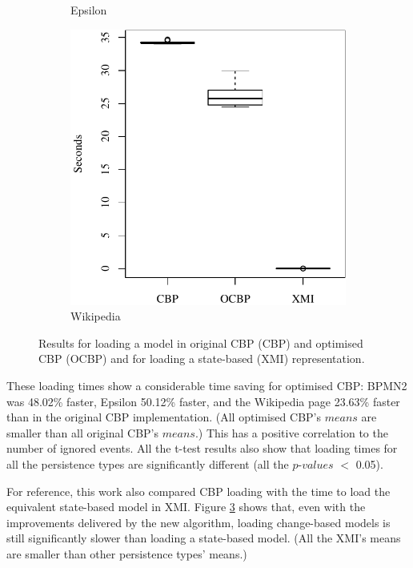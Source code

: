 {\begin{figure}[ht]
\begin{subfigure}{0.325\textwidth}
      \caption{Epsilon}
      \label{fig:load_time_epsilon}
    \end{subfigure}
    \hfill
    \begin{subfigure}{0.325\textwidth}
      \centering
      \includegraphics[width=\linewidth]{images/ol_load_time_wikipedia}
      \caption{Wikipedia}
      \label{fig:load_time_wikipedia}
    \end{subfigure}
    \caption{Results for loading a model in original CBP (CBP) and optimised CBP (OCBP) and for loading a state-based (XMI) representation.}
    \label{fig:loadtime}
  \end{figure}
  
  These loading times show a considerable time saving for optimised CBP: BPMN2 was 48.02\% faster, Epsilon 50.12\% faster, and the Wikipedia page 23.63\% faster than in the original CBP implementation. (All optimised CBP’s $means$ are smaller than all original CBP’s $means$.) This has a positive correlation to the number of ignored events. All the t-test results also show that loading times for all the persistence types are significantly different (all the $p$-$values$ $<$ 0.05).
  
  For reference, this work also compared CBP loading with the time to load the equivalent state-based model in XMI. Figure \ref{fig:loadtime} shows that, even with the improvements delivered by the new algorithm, loading change-based models is still significantly slower than loading a state-based model. (All the XMI’s means are smaller than other persistence types’ means.)
  
}
